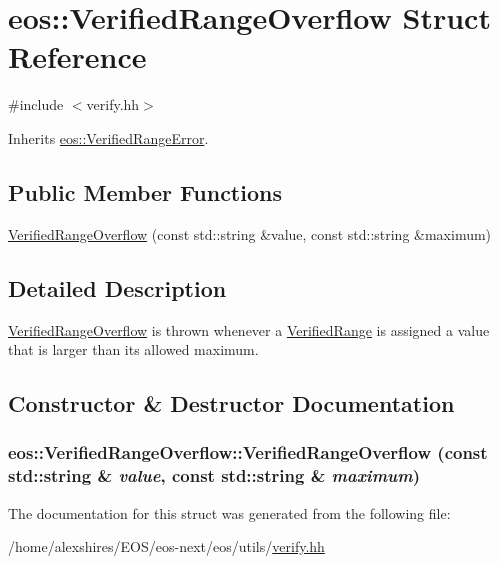 \hypertarget{structeos_1_1VerifiedRangeOverflow}{
\section{eos::VerifiedRangeOverflow Struct Reference}
\label{structeos_1_1VerifiedRangeOverflow}
}


{\ttfamily \#include $<$verify.hh$>$}

Inherits \hyperlink{classeos_1_1VerifiedRangeError}{eos::VerifiedRangeError}.\subsection*{Public Member Functions}
\begin{DoxyCompactItemize}
\item 
\hyperlink{structeos_1_1VerifiedRangeOverflow_aa87d45b5209b4abf25baa50048c40172}{VerifiedRangeOverflow} (const std::string \&value, const std::string \&maximum)
\end{DoxyCompactItemize}


\subsection{Detailed Description}
\hyperlink{structeos_1_1VerifiedRangeOverflow}{VerifiedRangeOverflow} is thrown whenever a \hyperlink{classeos_1_1VerifiedRange}{VerifiedRange} is assigned a value that is larger than its allowed maximum. 

\subsection{Constructor \& Destructor Documentation}
\hypertarget{structeos_1_1VerifiedRangeOverflow_aa87d45b5209b4abf25baa50048c40172}{
\subsubsection[{VerifiedRangeOverflow}]{\setlength{\rightskip}{0pt plus 5cm}eos::VerifiedRangeOverflow::VerifiedRangeOverflow (const std::string \& {\em value}, \/  const std::string \& {\em maximum})}}
\label{structeos_1_1VerifiedRangeOverflow_aa87d45b5209b4abf25baa50048c40172}


The documentation for this struct was generated from the following file:\begin{DoxyCompactItemize}
\item 
/home/alexshires/EOS/eos-\/next/eos/utils/\hyperlink{verify_8hh}{verify.hh}\end{DoxyCompactItemize}
